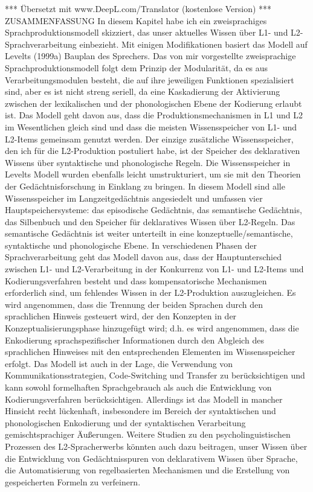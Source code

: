 \documentclass[
  letterpaper,
]{scrbook}
\begin{document}
*** Übersetzt mit www.DeepL.com/Translator (kostenlose Version) ***
ZUSAMMENFASSUNG In diesem Kapitel habe ich ein zweisprachiges
Sprachproduktionsmodell skizziert, das unser aktuelles Wissen über L1-
und L2-Sprachverarbeitung einbezieht. Mit einigen Modifikationen basiert
das Modell auf Levelts (1999a) Bauplan des Sprechers. Das von mir
vorgestellte zweisprachige Sprachproduktionsmodell folgt dem Prinzip der
Modularität, da es aus Verarbeitungsmodulen besteht, die auf ihre
jeweiligen Funktionen spezialisiert sind, aber es ist nicht streng
seriell, da eine Kaskadierung der Aktivierung zwischen der lexikalischen
und der phonologischen Ebene der Kodierung erlaubt ist. Das Modell geht
davon aus, dass die Produktionsmechanismen in L1 und L2 im Wesentlichen
gleich sind und dass die meisten Wissensspeicher von L1- und L2-Items
gemeinsam genutzt werden. Der einzige zusätzliche Wissensspeicher, den
ich für die L2-Produktion postuliert habe, ist der Speicher des
deklarativen Wissens über syntaktische und phonologische Regeln. Die
Wissensspeicher in Levelts Modell wurden ebenfalls leicht
umstrukturiert, um sie mit den Theorien der Gedächtnisforschung in
Einklang zu bringen. In diesem Modell sind alle Wissensspeicher im
Langzeitgedächtnis angesiedelt und umfassen vier Hauptspeichersysteme:
das episodische Gedächtnis, das semantische Gedächtnis, das Silbenbuch
und den Speicher für deklaratives Wissen über L2-Regeln. Das semantische
Gedächtnis ist weiter unterteilt in eine konzeptuelle/semantische,
syntaktische und phonologische Ebene. In verschiedenen Phasen der
Sprachverarbeitung geht das Modell davon aus, dass der Hauptunterschied
zwischen L1- und L2-Verarbeitung in der Konkurrenz von L1- und L2-Items
und Kodierungsverfahren besteht und dass kompensatorische Mechanismen
erforderlich sind, um fehlendes Wissen in der L2-Produktion
auszugleichen. Es wird angenommen, dass die Trennung der beiden Sprachen
durch den sprachlichen Hinweis gesteuert wird, der den Konzepten in der
Konzeptualisierungsphase hinzugefügt wird; d.h. es wird angenommen, dass
die Enkodierung sprachspezifischer Informationen durch den Abgleich des
sprachlichen Hinweises mit den entsprechenden Elementen im
Wissensspeicher erfolgt. Das Modell ist auch in der Lage, die Verwendung
von Kommunikationsstrategien, Code-Switching und Transfer zu
berücksichtigen und kann sowohl formelhaften Sprachgebrauch als auch die
Entwicklung von Kodierungsverfahren berücksichtigen. Allerdings ist das
Modell in mancher Hinsicht recht lückenhaft, insbesondere im Bereich der
syntaktischen und phonologischen Enkodierung und der syntaktischen
Verarbeitung gemischtsprachiger Äußerungen. Weitere Studien zu den
psycholinguistischen Prozessen des L2-Spracherwerbs könnten auch dazu
beitragen, unser Wissen über die Entwicklung von Gedächtnisspuren von
deklarativem Wissen über Sprache, die Automatisierung von regelbasierten
Mechanismen und die Erstellung von gespeicherten Formeln zu verfeinern.
\end{document}
